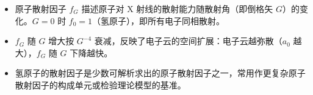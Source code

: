 \begin{insightbox}[物理图像]
\begin{itemize}
    \item 原子散射因子 $f_G$ 描述原子对 X 射线的散射能力随散射角（即倒格矢 $G$）的变化。$G=0$ 时 $f_0=1$（氢原子），即所有电子同相散射。
    \item $f_G$ 随 $G$ 增大按 $G^{-4}$ 衰减，反映了电子云的空间扩展：电子云越弥散（$a_0$ 越大），$f_G$ 随 $G$ 下降越快。
    \item 氢原子的散射因子是少数可解析求出的原子散射因子之一，常用作更复杂原子散射因子的构成单元或检验理论模型的基准。
\end{itemize}
\end{insightbox}
